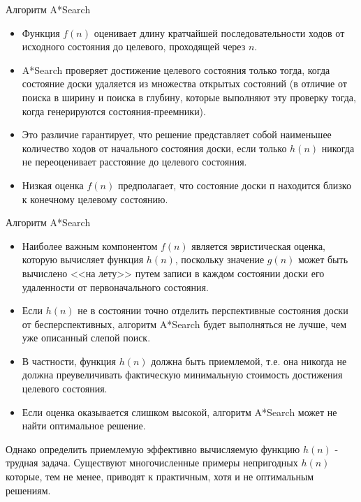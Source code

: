 \documentclass{beamer}
\begin{document}
\begin{frame}{Алгоритм A*Search}
\begin{itemize}
\item Функция $f(n)$ оценивает длину кратчайшей последовательности ходов от исходного состояния до целевого, проходящей через $n$. 
\item A*Search проверяет достижение целевого состояния только тогда, когда состояние доски удаляется из множества открытых состояний (в отличие от поиска в ширину и поиска в глубину, которые выполняют эту проверку тогда, когда генерируются состояния-преемники).
\item Это различие гарантирует, что решение представляет собой наименьшее количество ходов от начального состояния доски, если только $h(n)$ никогда не переоценивает расстояние до целевого состояния.
\item Низкая оценка $f(n)$ предполагает, что состояние доски п находится близко к конечному целевому состоянию.
\end{itemize}
\end{frame}

\begin{frame}{Алгоритм A*Search}
\begin{itemize}
\item Наиболее важным компонентом $f(n)$ является эвристическая оценка, которую вычисляет функция $h(n)$, поскольку значение $g(n)$ может
быть вычислено <<на лету>> путем записи в каждом состоянии доски его удаленности от первоначального состояния. 
\item Если $h(n)$ не в состоянии точно отделить перспективные состояния доски от бесперспективных, алгоритм A*Search будет выполняться не
лучше, чем уже описанный слепой поиск. 
\item В частности, функция $h(n)$ должна быть приемлемой, т.е. она никогда не должна преувеличивать фактическую минимальную стоимость достижения целевого состояния. 
\item Если оценка оказывается слишком высокой, алгоритм A*Search может не найти оптимальное решение. 
\end{itemize}
Однако определить приемлемую эффективно вычисляемую функцию $h(n)$ - трудная задача. Существуют многочисленные примеры непригодных $h(n)$ которые, тем не менее, приводят к практичным, хотя и не оптимальным решениям.
\end{frame}
\end{document}
